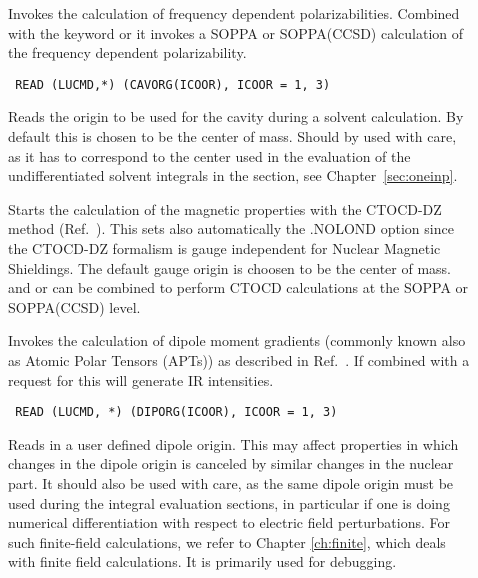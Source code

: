 \begin{description}

\item[] Invokes the calculation of frequency dependent
polarizabilities.
 Combined with the 
keyword  or  it invokes a SOPPA or SOPPA(CCSD) 
 calculation of the frequency dependent polarizability.

\item[]\verb| |\newline
\verb|READ (LUCMD,*) (CAVORG(ICOOR), ICOOR = 1, 3)|

Reads the origin to be used for the cavity
during a solvent calculation. By default this is chosen to be the
center of mass. Should by used with care, as it
has to correspond to the center used in the evaluation of the
undifferentiated solvent integrals in the {\her} section, see Chapter~\ref{sec:oneinp}.

\item[] Starts the calculation of the magnetic properties with the
CTOCD-DZ method (Ref.~\cite{paololazz1,paololazz2,ctocd}). This sets also 
automatically the .NOLOND option since the CTOCD-DZ formalism is gauge 
independent for Nuclear Magnetic Shieldings. The default gauge origin is choosen to be 
the center of mass.   and  or  can be combined to 
perform CTOCD calculations at the SOPPA or SOPPA(CCSD) level.

\item[] Invokes the calculation of dipole moment
gradients
(commonly known also as Atomic Polar Tensors 
(APTs)) as described in Ref.~\cite{tuhhjajpjjcp84}. If combined with a
request for  this will generate IR intensities.  

\item[]\verb| |\newline
\verb|READ (LUCMD, *) (DIPORG(ICOOR), ICOOR = 1, 3)|

Reads in a user defined dipole origin. This may
affect properties in 
which changes in the dipole origin is canceled by
similar changes in the 
nuclear part. It should also be used with care, as the same dipole
origin must be used during the integral evaluation sections, in
particular if one is doing numerical 
differentiation with respect to electric field perturbations. For such
finite-field calculations, we refer to Chapter
\ref{ch:finite}, which deals with finite field calculations. It is
primarily used for debugging.  


\end{description}
